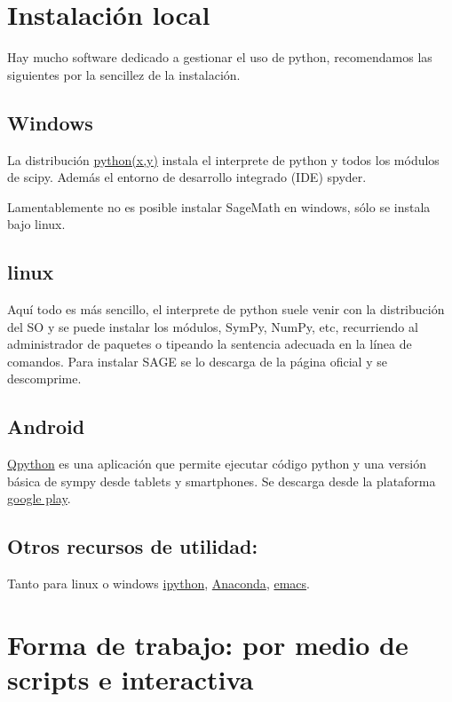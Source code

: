 \section{Instalación local}

Hay mucho software dedicado a gestionar el uso de python, recomendamos las siguientes por la sencillez de la instalación.  

\subsection{Windows} La distribución  \href{https://code.google.com/p/pythonxy/}{python(x,y)}  instala el interprete de python y todos los módulos de scipy. Además el entorno de desarrollo integrado (IDE) spyder.

Lamentablemente no es posible instalar SageMath en windows, sólo se instala bajo linux.

\subsection{linux} Aquí todo es más sencillo, el interprete de python suele venir con la distribución del SO y se puede instalar los módulos, SymPy, NumPy, etc, recurriendo al administrador de paquetes o tipeando la sentencia adecuada en la línea de comandos.  Para instalar SAGE se lo descarga de la página oficial y se descomprime.

\subsection{Android} \href{http://qpython.com/}{Qpython} es una aplicación que permite ejecutar código python y una versión básica de sympy desde tablets y smartphones. Se descarga desde la plataforma \href{https://play.google.com/store/apps/details?id=com.hipipal.qpyplus}{google play}.

\subsection{Otros recursos de utilidad:} Tanto para linux o windows \href{http://ipython.org}{ipython}, \href{http://continuum.io/downloads}{Anaconda}, \href{http://www.gnu.org/software/emacs/}{emacs}.


\section{Forma de trabajo: por medio de scripts e interactiva}


